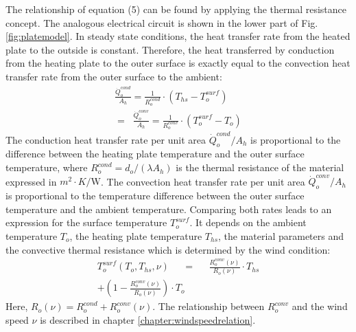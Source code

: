 The relationship of equation (5) can be found by applying the thermal resistance concept. The analogous electrical circuit is shown in the lower part of Fig. \ref{fig:platemodel}. In steady state conditions, the heat transfer rate from the heated plate to the outside is constant. Therefore, the heat transferred by conduction from the heating plate to the outer surface is exactly equal to the convection heat transfer rate from the outer surface to the ambient:
\begin{multline}
\frac{\dot Q_o^{cond}}{A_h} = \frac{1}{R_o^{cond}}\cdot (T_{hs}-T_o^{surf}) \;\; \\
= \;\;\frac{\dot Q_o^{conv}}{A_h} = \frac{1}{R_o^{conv}}\cdot (T_o^{surf}-T_{o})
\end{multline}
The conduction heat transfer rate per unit area \(\dot Q_o^{cond}/A_h\) is proportional to the difference between the heating plate temperature and the outer surface temperature, where \(R_o^{cond} = d_o/(\lambda A_h)\) is the thermal resistance of the material expressed in \(m^2\cdot K/\mathrm{W}\). The convection heat transfer rate per unit area \(\dot Q_o^{conv}/A_h\) is proportional to the temperature difference between the outer surface temperature and the ambient temperature. Comparing both rates leads to an expression for the surface temperature $T_o^{surf}$. It depends on the ambient temperature $T_o$, the heating plate temperature $T_{hs}$, the material parameters and the convective thermal resistance  which is determined by the wind condition:
\begin{multline}
T_o^{surf}(T_o,T_{hs},\nu) \;\;\;\;\; = \;\;\;\;\; \frac{R_o^{conv}(\nu)}{R_{o}(\nu)}\cdot T_{hs} \\
+ (1-\frac{R_o^{conv}(\nu)}{R_{o}(\nu)})\cdot T_o
\end{multline}
Here, $R_o(\nu) = R_o^{cond} + R_o^{conv}(\nu)$. The relationship between \(R_o^{conv}\) and the wind speed \(\nu\) is described in chapter \ref{chapter:windspeedrelation}. 


